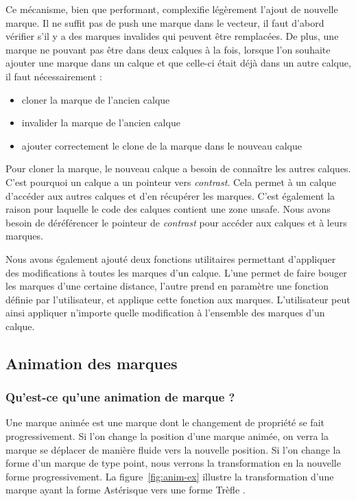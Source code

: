 \documentclass[12pt]{article}
\begin{document}
Ce mécanisme, bien que performant, complexifie légèrement l'ajout de nouvelle marque. Il ne suffit pas de
push une marque dans le vecteur, il faut d'abord vérifier s'il y a des marques invalides qui peuvent être
remplacées.
De plus, une marque ne pouvant pas être dans deux calques à la fois, lorsque l'on souhaite ajouter une
marque dans un calque et que celle-ci était déjà dans un autre calque, il faut nécessairement :
\begin{itemize}
\item cloner la marque de l'ancien calque
\item invalider la marque de l'ancien calque
\item ajouter correctement le clone de la marque dans le nouveau calque
\end{itemize}
Pour cloner la marque, le nouveau calque a besoin de connaître les autres calques. C'est pourquoi un
calque a un pointeur vers \textit{contrast}. Cela permet à un calque d'accéder aux autres calques et d'en
récupérer les  marques. C'est également la raison pour laquelle le code des calques contient une zone
\gls{unsafe}. Nous avons besoin de déréférencer le pointeur de \textit{contrast} pour accéder aux calques et à
leurs marques.

Nous avons également ajouté deux fonctions utilitaires permettant d'appliquer des modifications à toutes
les marques d'un calque. L'une permet de faire bouger les marques d'une certaine distance, l'autre prend
en paramètre une fonction définie par l'utilisateur, et applique cette fonction aux marques. L'utilisateur
peut ainsi appliquer n'importe quelle modification à l'ensemble des marques d'un calque.

\subsection{Animation des marques}
\subsubsection{Qu'est-ce qu'une animation de marque ?}

Une marque animée est une marque dont le changement de propriété se fait progressivement.
Si l'on change la position d'une marque animée, on verra la marque se déplacer de manière fluide vers la
nouvelle position. Si l'on change la forme d'un marque de type point, nous verrons la transformation en la nouvelle forme progressivement.
La figure~\ref{fig:anim-ex} illustre la transformation d'une marque ayant la forme \og Astérisque \fg vers une
forme \og Trèfle \fg.
\end{document}
